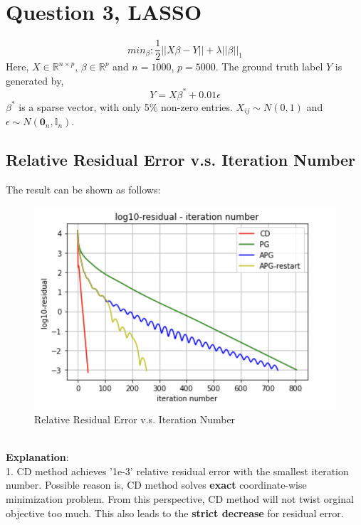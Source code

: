 \documentclass{article}
\begin{document}
\section{Question 3, LASSO}
\begin{equation}
	min_{\beta} : \frac{1}{2}||X\beta - Y|| + \lambda||\beta||_1
\end{equation}
Here, $X\in \mathbb{R}^{n\times p}$, $\beta \in \mathbb{R}^p$ and $n=1000$, $p=5000$. The ground truth label $Y$ is generated by,
\begin{equation}
	\nonumber
	Y = X\beta^* + 0.01\epsilon
\end{equation}
$\beta^*$ is a sparse vector, with only 5\% non-zero entries. $X_{ij} \sim N(0,1)$ and $\epsilon \sim N(\mathbf{0}_n,\mathbb{I}_n)$.
\newpage
\subsection{Relative Residual Error v.s. Iteration Number}
The result can be shown as follows:
\begin{figure}[h]
	\centering
	\includegraphics[width=.35\textheight]{c.png}
	\caption{Relative Residual Error v.s. Iteration Number}
	\label{fig:001}
\end{figure}
\\
\textbf{Explanation}:
\vspace{4pt}
\\
1. CD method achieves '1e-3' relative residual error with the smallest iteration number. Possible reason is, CD  method solves \textbf{exact} coordinate-wise minimization problem. From this perspective, CD method will not twist orginal objective too much. This also leads to the\textbf{ strict decrease} for residual error.
\end{document}
